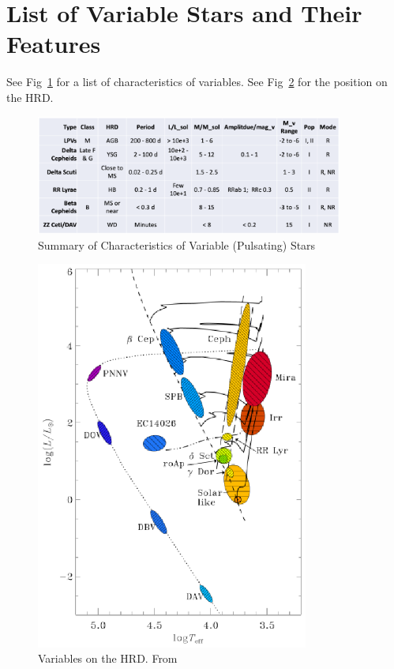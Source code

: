 \documentclass{spy}
\begin{document}
\section{List of Variable Stars and Their Features}
See Fig~\ref{variables_list_table} for a list of characteristics of variables. See Fig~\ref{hrd_variables_diagram} for the position on the HRD.

\begin{figure}[h]
    \centering
    \includegraphics[width=0.9\textwidth]{variables_list.eps}
    \caption{Summary of Characteristics of Variable (Pulsating) Stars}   
    \label{variables_list_table}
\end{figure}

\begin{figure}[ht]
    \centering
    \includegraphics[width=0.8\textwidth]{hrd_variables.eps}
    \caption{Variables on the HRD. From \citet{MiraVariablesPeriod}}
    \label{hrd_variables_diagram}
\end{figure}
\end{document}
